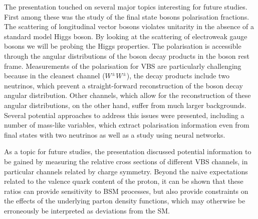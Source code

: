 The presentation touched on several major topics interesting for future studies. First among these was the study of the final state bosons polarisation fractions. The scattering of longitudinal vector bosons violates unitarity in the absence of a standard model Higgs boson. By looking at the scattering of electroweak gauge bosons we will be probing the Higgs properties. %
The polarisation is accessible through the angular distributions of the boson decay products in the boson rest frame. 
Measurements of the polarisation for VBS are particularly challenging because in the cleanest channel ($W^\pm W^\pm$), the decay products include two neutrinos, which prevent a straight-forward reconstruction of the boson decay angular distribution. Other channels, which allow for the reconstruction of these angular distributions, on the other hand, suffer from much larger backgrounds. Several potential approaches to address this issues were presented, including a number of mass-like variables, which extract polarisation information even from final states with two neutrinos as well as a study using neural networks. 


As a topic for future studies, the presentation discussed potential information to be gained by measuring the relative cross sections of different VBS channels, in particular channels related by charge symmetry. Beyond the naive expectations related to the valence quark content of the proton, it can be shown that these ratios can provide sensitivity to BSM processes, but also provide constraints on the effects of the underlying parton density functions, which may otherwise be erroneously be interpreted as deviations from the SM.

